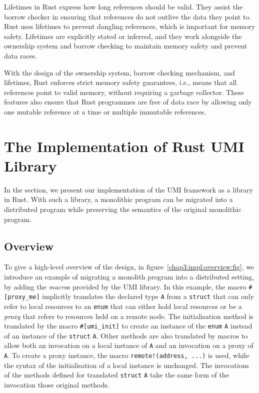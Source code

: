 Lifetimes in Rust express how long references should be valid. They assist the borrow checker in ensuring that references do not outlive the data they point to. Rust uses lifetimes to prevent dangling references, which is important for memory safety. Lifetimes are explicitly stated or inferred, and they work alongside the ownership system and borrow checking to maintain memory safety and prevent data races.

With the design of the ownership system, borrow checking mechanism, and lifetimes, Rust enforces strict memory safety guarantees, i.e., means that all references point to valid memory, without requiring a garbage collector. These features also ensure that Rust programmes are free of data race by allowing only one mutable reference at a time or multiple immutable references.

\section{The Implementation of Rust UMI Library}
\label{chap3:implementation}
In the section, we present our implementation of the UMI framework as a library in Rust. With such a library, a monolithic program can be migrated into a distributed program while preserving the semantics of the original monolithic program.

\subsection{Overview}
\label{chap3:impl:overview}
To give a high-level overview of the design, in figure~\ref{chap3:impl:overview:fig}, we introduce an example of migrating a monolith program into a distributed setting, by adding the \emph{macro}s provided by the UMI library. In this example, the macro \texttt{\#[proxy\_me]} implicitly translates the declared type \texttt{A} from a \texttt{struct} that can only refer to local resources to an \texttt{enum} that can either hold local resources or be a \emph{proxy} that refers to resources held on a remote node. The initialisation method is translated by the macro \texttt{\#[umi\_init]} to create an instance of the \texttt{enum} \texttt{A} instead of an instance of the \texttt{struct} \texttt{A}. Other methods are also translated by macros to allow both an invocation on a local instance of \texttt{A} and an invocation on a proxy of \texttt{A}. To create a proxy instance, the macro \texttt{remote!(address, ...)} is used, while the syntax of the initialisation of a local instance is unchanged. The invocations of the methods defined for translated \texttt{struct} \texttt{A} take the same form of the invocation those original methods.


